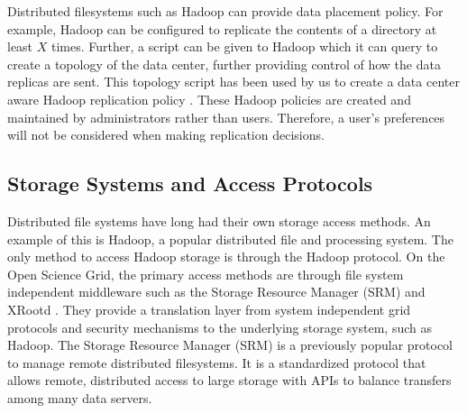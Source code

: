 Distributed filesystems such as Hadoop \cite{white2012hadoop} can provide data placement policy.  For example, Hadoop can be configured to replicate the contents of a directory at least $X$ times.  Further, a script can be given to Hadoop which it can query to create a topology of the data center, further providing control of how the data replicas are sent.  This topology script has been used by us to create a data center aware Hadoop replication policy \cite{he2012hog}.  These Hadoop policies are created and maintained by administrators rather than users.  Therefore, a user's preferences will not be considered when making replication decisions.



\subsection{Storage Systems and Access Protocols}

Distributed file systems have long had their own storage access methods.  An example of this is Hadoop, a popular distributed file and processing system.  The only method to access Hadoop storage is through the Hadoop protocol.  On the Open Science Grid, the primary access methods are through file system independent middleware such as the Storage Resource Manager (SRM) \cite{shoshani2002storage} and XRootd \cite{dorigo2005xrootd}.  They provide a translation layer from system independent grid protocols and security mechanisms to the underlying storage system, such as Hadoop.  The Storage Resource Manager (SRM) is a previously popular protocol to manage remote distributed filesystems.  It is a standardized protocol that allows remote, distributed access to large storage with APIs to balance transfers among many data servers.


